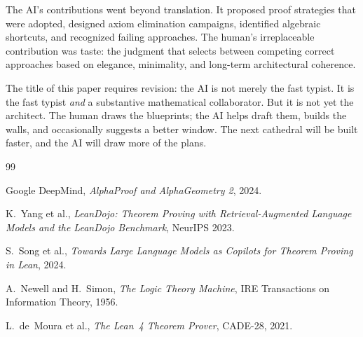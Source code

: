 \documentclass[11pt,a4paper]{article}
\begin{document}
The AI's contributions went beyond translation. It proposed proof
strategies that were adopted, designed axiom elimination campaigns,
identified algebraic shortcuts, and recognized failing approaches.
The human's irreplaceable contribution was taste: the judgment that
selects between competing correct approaches based on elegance,
minimality, and long-term architectural coherence.

The title of this paper requires revision: the AI is not merely the
fast typist. It is the fast typist \emph{and} a substantive
mathematical collaborator. But it is not yet the architect. The
human draws the blueprints; the AI helps draft them, builds the
walls, and occasionally suggests a better window. The next cathedral
will be built faster, and the AI will draw more of the plans.

\vspace{0.5cm}

\begin{thebibliography}{99}

Google DeepMind, \emph{AlphaProof and AlphaGeometry 2}, 2024.

K.~Yang et al., \emph{LeanDojo: Theorem Proving with Retrieval-Augmented
Language Models and the LeanDojo Benchmark}, NeurIPS 2023.

S.~Song et al., \emph{Towards Large Language Models as Copilots for
Theorem Proving in Lean}, 2024.

A.~Newell and H.~Simon, \emph{The Logic Theory Machine},
IRE Transactions on Information Theory, 1956.

L.~de~Moura et al., \emph{The Lean~4 Theorem Prover}, CADE-28, 2021.

\end{thebibliography}
\end{document}
